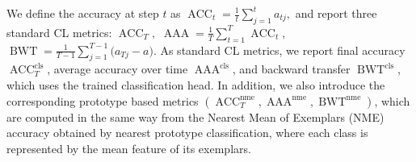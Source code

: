 \documentclass[10pt]{article} %
\begin{document}


We define the accuracy at step $t$ as
$
\operatorname{ACC}_t = \frac{1}{t} \sum_{j=1}^{t} a_{tj},
$
and report three standard CL metrics:
$
\operatorname{ACC}_T,$
$\operatorname{AAA} =\frac{1}{T} \sum_{t=1}^{T} \operatorname{ACC}_t, $
$\operatorname{BWT} =\frac{1}{T - 1} \sum_{j=1}^{T - 1} \bigl(a_{Tj} - a\bigr).$
As standard CL metrics, we report final accuracy $\operatorname{ACC}_T^{\mathrm{cls}}$, average accuracy over time $\operatorname{AAA}^{\mathrm{cls}}$, and backward transfer $\operatorname{BWT}^{\mathrm{cls}}$, which uses the trained classification head. In addition, we also introduce the corresponding prototype based metrics $(\operatorname{ACC}_T^{\mathrm{nme}}, \operatorname{AAA}^{\mathrm{nme}}, \operatorname{BWT}^{\mathrm{nme}})$, which are computed in the same way from the Nearest Mean of Exemplars (NME) accuracy obtained by nearest prototype classification, where each class is represented by the mean feature of its exemplars.
\end{document}
